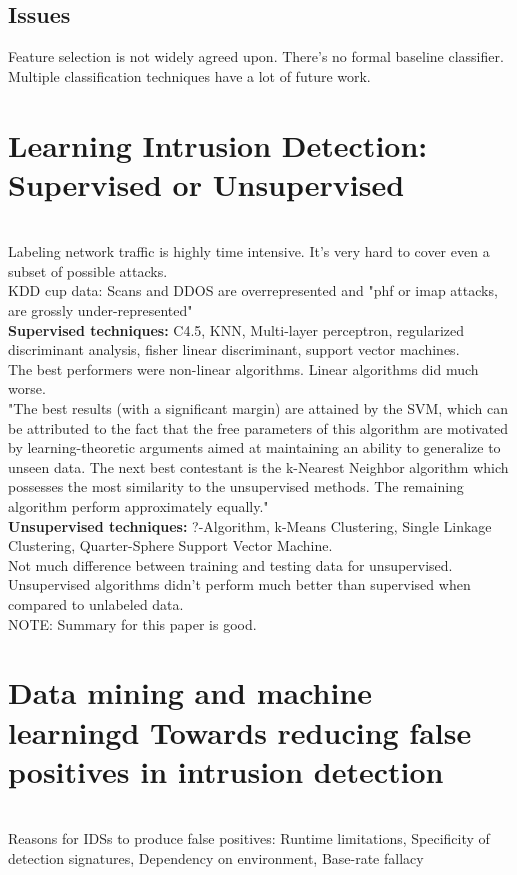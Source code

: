 \documentclass{article}
\begin{document}
\subsection*{Issues}
Feature selection is not widely agreed upon. There's no formal baseline classifier. Multiple classification techniques have a lot of future work.\\

\section*{Learning Intrusion Detection: Supervised or Unsupervised}
\cite{laskov05}\\
Labeling network traffic is highly time intensive. It's very hard to cover even a subset of possible attacks.\\
KDD cup data: Scans and DDOS are overrepresented and "phf or imap attacks, are grossly under-represented"\\

\textbf{Supervised techniques:} C4.5, KNN, Multi-layer perceptron, regularized discriminant analysis, fisher linear discriminant, support vector machines.\\
The best performers were non-linear algorithms. Linear algorithms did much worse.\\
"The best results (with a significant margin) are attained by the SVM, which can be attributed to the fact that the free parameters of this algorithm are motivated by learning-theoretic arguments aimed at maintaining an ability to generalize to unseen data. The next best contestant is the k-Nearest Neighbor algorithm which possesses the most similarity to the unsupervised methods. The remaining algorithm perform approximately equally."\\
\textbf{Unsupervised techniques:} ?-Algorithm, k-Means Clustering, Single Linkage Clustering, 
Quarter-Sphere Support Vector Machine.\\
Not much difference between training and testing data for unsupervised.\\
Unsupervised algorithms didn't perform much better than supervised when compared to unlabeled data.\\
NOTE: Summary for this paper is good.\\

\section*{Data mining and machine learningd Towards reducing false positives in intrusion detection}
\cite{pietraszek05}\\
Reasons for IDSs to produce false positives: Runtime limitations, Specificity of detection signatures, Dependency on environment, Base-rate fallacy\\
\end{document}
